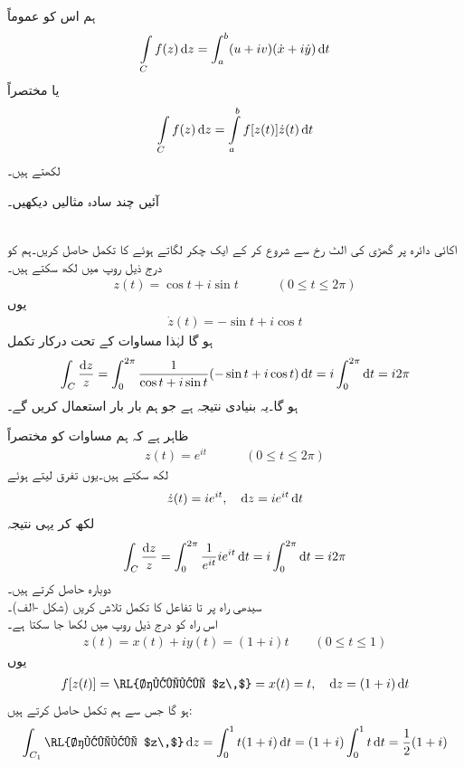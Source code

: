 ہم اس کو عموماً
\begin{align*}
\int\limits_C f(z)\dif z=\int_a^b (u+iv)(\dot{x}+i\dot{y})\dif t
\end{align*}
یا مختصراً
\begin{align}\label{مساوات_مخلوط_تکمل_راہ_ج}
\int\limits_C f(z)\dif z=\int\limits_a^b f[z(t)]\dot{z}(t)\dif t
\end{align}
لکھتے ہیں۔

آئیں چند سادہ مثالیں دیکھیں۔

\quad {}\\
اکائی دائرہ  پر گھڑی کی الٹ رخ  سے شروع کر کے ایک چکر لگاتے ہوئے  کا تکمل حاصل کریں۔ہم  کو درج ذیل روپ میں لکھ سکتے ہیں۔
\begin{align}\label{مساوات_مخلوط_تکمل_اکائی_رداس_الف}
z(t)=\cos t+i\sin t\quad \quad \quad (0\le t\le 2\pi)
\end{align}
یوں
\begin{align*}
\dot{z}(t)=-\sin t+i\cos t
\end{align*}
ہو گا لہٰذا مساوات  کے تحت درکار تکمل
\begin{align*}
\int_C\frac{\dif z}{z}=\int_0^{2\pi} \frac{1}{\cos t+i\sin t} (-\sin t+i\cos t)\dif t=i\int_0^{2\pi} \dif t=i2\pi
\end{align*}
ہو گا۔یہ بنیادی نتیجہ ہے جو ہم بار بار استعمال کریں گے۔

ظاہر ہے کہ ہم مساوات  کو مختصراً
\begin{align}\label{مساوات_مخلوط_تکمل_اکائی_رداس_ب}
z(t)=e^{it}\quad \quad \quad (0\le t\le 2\pi)
\end{align}
لکھ سکتے ہیں۔یوں تفرق لیتے ہوئے
\begin{align*}
\dot{z}(t)=ie^{it},\quad \dif z=ie^{it}\dif t
\end{align*}
لکھ کر یہی نتیجہ
\begin{align}
\int_C \frac{\dif z}{z}=\int_0^{2\pi} \frac{1}{e^{it}}ie^{it}\dif t=i\int_0^{2\pi}\dif t=i2\pi
\end{align}
دوبارہ حاصل کرتے ہیں۔ 
\quad {}\\
سیدھی راہ  پر  تا  تفاعل  کا تکمل تلاش کریں 
(شکل -الف)۔\\
اس راہ کو درج ذیل روپ میں لکھا جا سکتا ہے۔
\begin{align*}
z(t)=x(t)+iy(t)=(1+i)t\quad \quad (0\le t\le 1)
\end{align*} 
یوں 
\begin{align*}
f[z(t)]=\text{\RL{حقیقی $z\,$}}=x(t)=t,\quad \dif z=(1+i)\dif t
\end{align*}
ہو گا جس سے ہم تکمل حاصل کرتے ہیں:
\begin{align*}
\int_{C_1} \text{\RL{حقیقی $z\,$}}\dif z=\int_0^1 t(1+i)\dif t=(1+i)\int_0^1 t\dif t=\frac{1}{2}(1+i)
\end{align*}

